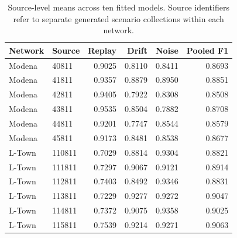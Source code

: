 \begin{table}[tbp]
\centering\small
\caption[Source-level means across ten models]{Source-level means across ten fitted models. Source identifiers refer to separate generated scenario collections within each network.}
\label{tab:sourcemeans}
\begin{tabular}{@{}llrrrr@{}}
\toprule
Network & Source & Replay & Drift & Noise & Pooled F1\\
\midrule
Modena & 40811 & 0.9025 & 0.8110 & 0.8411 & 0.8693\\
Modena & 41811 & 0.9357 & 0.8879 & 0.8950 & 0.8851\\
Modena & 42811 & 0.9405 & 0.7922 & 0.8308 & 0.8508\\
Modena & 43811 & 0.9535 & 0.8504 & 0.7882 & 0.8708\\
Modena & 44811 & 0.9201 & 0.7747 & 0.8544 & 0.8579\\
Modena & 45811 & 0.9173 & 0.8481 & 0.8538 & 0.8677\\
L-Town & 110811 & 0.7029 & 0.8814 & 0.9304 & 0.8821\\
L-Town & 111811 & 0.7297 & 0.9067 & 0.9121 & 0.8914\\
L-Town & 112811 & 0.7403 & 0.8492 & 0.9346 & 0.8831\\
L-Town & 113811 & 0.7229 & 0.9277 & 0.9272 & 0.9047\\
L-Town & 114811 & 0.7372 & 0.9075 & 0.9358 & 0.9025\\
L-Town & 115811 & 0.7539 & 0.9214 & 0.9271 & 0.9063\\
\bottomrule
\end{tabular}
\end{table}
